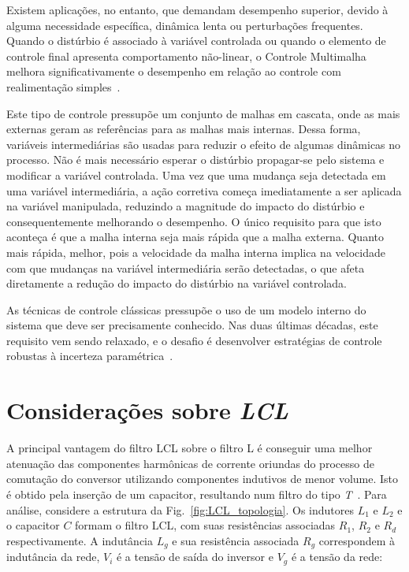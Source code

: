 	Existem aplicações, no entanto, que demandam desempenho superior, devido à alguma
	necessidade específica, dinâmica lenta ou perturbações frequentes. Quando o distúrbio
	é associado à variável controlada ou quando o elemento de controle final apresenta
	comportamento não-linear, o Controle Multimalha melhora significativamente o
	desempenho em relação ao controle com realimentação simples~\cite{ref:KRISHNA}.

	Este tipo de controle pressupõe um conjunto de malhas em cascata, onde as mais
	externas geram as referências para as malhas mais internas. Dessa forma, variáveis
	intermediárias são usadas para reduzir o efeito de algumas dinâmicas no processo.
	Não é mais necessário esperar o distúrbio propagar-se pelo sistema e modificar a
	variável controlada. Uma vez que uma mudança seja detectada em uma variável
	intermediária, a ação corretiva começa imediatamente a ser aplicada na variável
	manipulada, reduzindo a magnitude do impacto do distúrbio e consequentemente
	melhorando o desempenho. O único requisito para que isto aconteça é que a malha
	interna seja mais rápida que a malha externa. Quanto mais rápida, melhor, pois
	a velocidade da malha interna implica na velocidade com que mudanças na variável
	intermediária serão detectadas, o que afeta diretamente a redução do impacto
	do distúrbio na variável controlada.

	As técnicas de controle clássicas pressupõe o uso de um modelo interno do sistema
	que deve ser precisamente conhecido. Nas duas últimas décadas, este requisito
	vem sendo relaxado, e o desafio é desenvolver estratégias de controle robustas
	à incerteza paramétrica~\cite{ref:GEROMEL}.


\section{Considerações sobre \emph{LCL}}

    A principal vantagem do filtro LCL sobre o filtro L é conseguir uma melhor
    atenuação das componentes harmônicas de corrente oriundas do processo de comutação do
    conversor utilizando componentes indutivos de menor volume. Isto é obtido pela
    inserção de um capacitor, resultando num filtro do tipo \emph{T}~\cite{ref:SHEN}.
    Para análise, considere a estrutura da Fig.~\ref{fig:LCL_topologia}. Os indutores
    $L_1$ e $L_2$ e o capacitor $C$ formam o filtro LCL, com suas resistências
    associadas $R_1$, $R_2$ e $R_d$ respectivamente. A indutância $L_g$ e sua
    resistência associada $R_g$ correspondem à indutância da rede, $V_i$
    é a tensão de saída do inversor e $V_g$ é a tensão da rede:

